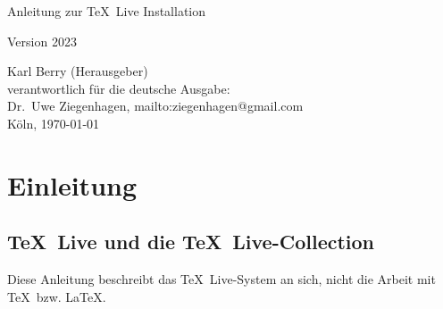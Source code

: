 \documentclass[12pt,ngerman,a4paper,fullparskip]{report}
\newcommand{\tlcurrentyear}{2023}
\newcommand{\TL}{\TeX\ Live\xspace}
\newcommand{\href}[2]{#1}
\begin{document}
\begin{titlepage}

\begin{center}
\vspace*{3cm}

 \Huge Anleitung zur \TL Installation \vspace*{1cm}

\Large Version \tlcurrentyear

\end{center}

\vfill \noindent Karl Berry (Herausgeber) \\
verantwortlich für die deutsche Ausgabe:\\ 
Dr.~Uwe Ziegenhagen, \href{mailto:ziegenhagen@gmail.com}{ziegenhagen@gmail.com} \\
Köln, \today
\end{titlepage}


\tableofcontents



\listoffigures



%
%


\chapter{Einleitung}\label{sec:intro}
\section{\TL und die \TL-Collection}

Diese Anleitung beschreibt das \TL-System an sich, nicht die Arbeit mit \TeX\ bzw. \LaTeX. 
\end{document}
